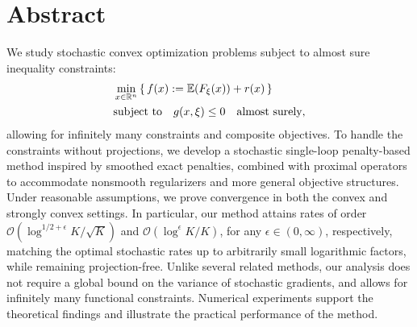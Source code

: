 \chapter*{Abstract}

We study stochastic convex optimization problems subject to almost sure
inequality constraints:
\begin{equation*}
    \begin{aligned}
    &\min_{x \in \mathbb{R}^n} \, \{\, f(x) := \mathbb{E}(F_\xi(x)) + r(x) \,\} \\
    &\textup{subject to} \quad g(x,\xi) \leq 0 \quad \textnormal{almost surely},
    \end{aligned}
\end{equation*}
allowing for infinitely many constraints and composite objectives.
To handle the constraints without projections, we develop a stochastic single-loop
penalty-based method inspired by smoothed exact penalties, combined
with proximal operators to accommodate nonsmooth regularizers and more
general objective structures. Under reasonable assumptions, we prove convergence in both
the convex and strongly convex settings.
In particular, our method attains rates of order
$\mathcal{O}(\log^{1/2+\epsilon} K / \sqrt{K})$ and $\mathcal{O}(\log^\epsilon K / K)$,
for any $\epsilon\in(0,\infty)$, respectively, matching the optimal stochastic rates
up to arbitrarily small logarithmic factors, while remaining projection-free.
Unlike several related methods, our analysis does not require a global bound
on the variance of stochastic gradients, and allows for infinitely many functional constraints.
Numerical experiments support the theoretical
findings and illustrate the practical performance of the method.
